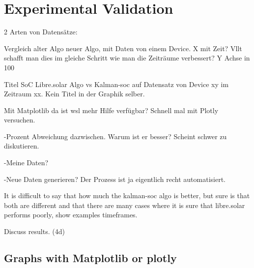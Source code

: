 %
%






\chapter{Experimental Validation}

2 Arten von Datensätze: 



Vergleich alter Algo neuer Algo, mit Daten von einem Device. X mit Zeit? Vllt schafft man dies im gleiche Schritt wie man die Zeiträume verbessert? Y Achse in 100%

Titel SoC Libre.solar Algo vs Kalman-soc auf Datensatz von Device xy im Zeitraum xx. Kein Titel in der Graphik selber. 

Mit Matplotlib da ist wsl mehr Hilfe verfügbar? Schnell mal mit Plotly versuchen. 



-Prozent Abweichung dazwischen. Warum ist er besser? Scheint schwer zu diskutieren.



-Meine Daten? 



-Neue Daten generieren? Der Prozess ist ja eigentlich recht automatisiert. 



It is difficult to say that how much the kalman-soc algo is better, but sure is that both are different and that there are many cases where it is sure that libre.solar performs poorly, show examples timeframes.

Discuss results.  (4d)

\section{Graphs with Matplotlib or plotly}


